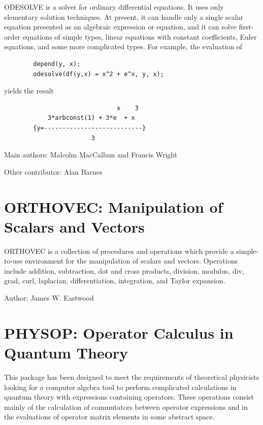 
ODESOLVE is a solver for ordinary differential equations.  It uses
only elementary solution techniques.  At present, it can handle only a
single scalar equation presented as an algebraic expression or
equation, and it can solve first-order equations of simple types,
linear equations with constant coefficients, Euler equations, and some
more complicated types.  For example, the evaluation of
\begin{verbatim}
        depend(y, x);
        odesolve(df(y,x) = x^2 + e^x, y, x);
\end{verbatim}
yields the result
\begin{verbatim}
                               x    3
            3*arbconst(1) + 3*e  + x
        {y=---------------------------}
                        3
\end{verbatim}

Main authors: Malcolm MacCallum and Francis Wright

Other contributor: Alan Barnes



\newpage


\section{ORTHOVEC: Manipulation of Scalars and Vectors}


ORTHOVEC is a collection of \REDUCE procedures and operations which
provide a simple-to-use environment for the manipulation of scalars and
vectors.  Operations include addition, subtraction, dot and cross
products, division, modulus, div, grad, curl, laplacian, differentiation,
integration, and Taylor expansion.

Author: James W. Eastwood



\newpage


\section{PHYSOP: Operator Calculus in Quantum Theory}


This package has been designed to meet the requirements of theoretical
physicists looking for a computer algebra tool to perform complicated
calculations in quantum theory with expressions containing operators.
These operations consist mainly of the calculation of commutators between
operator expressions and in the evaluations of operator matrix elements in
some abstract space.

